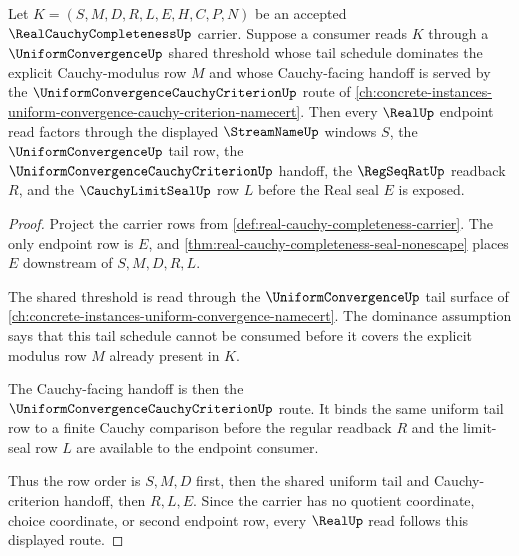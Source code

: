 \begin{theorem}
\label{thm:real-cauchy-completeness-uniform-tail-seal}
Let $K=(S,M,D,R,L,E,H,C,P,N)$ be an accepted $\RealCauchyCompletenessUp$ carrier. Suppose a consumer reads $K$ through a $\UniformConvergenceUp$ shared threshold whose tail schedule dominates the explicit Cauchy-modulus row $M$ and whose Cauchy-facing handoff is served by the $\UniformConvergenceCauchyCriterionUp$ route of \autoref{ch:concrete-instances-uniform-convergence-cauchy-criterion-namecert}. Then every $\RealUp$ endpoint read factors through the displayed $\StreamNameUp$ windows $S$, the $\UniformConvergenceUp$ tail row, the $\UniformConvergenceCauchyCriterionUp$ handoff, the $\RegSeqRatUp$ readback $R$, and the $\CauchyLimitSealUp$ row $L$ before the Real seal $E$ is exposed.
\end{theorem}
\begin{proof}
Project the carrier rows from \autoref{def:real-cauchy-completeness-carrier}. The only endpoint row is $E$, and \autoref{thm:real-cauchy-completeness-seal-nonescape} places $E$ downstream of $S,M,D,R,L$.

The shared threshold is read through the $\UniformConvergenceUp$ tail surface of \autoref{ch:concrete-instances-uniform-convergence-namecert}. The dominance assumption says that this tail schedule cannot be consumed before it covers the explicit modulus row $M$ already present in $K$.

The Cauchy-facing handoff is then the $\UniformConvergenceCauchyCriterionUp$ route. It binds the same uniform tail row to a finite Cauchy comparison before the regular readback $R$ and the limit-seal row $L$ are available to the endpoint consumer.

Thus the row order is $S,M,D$ first, then the shared uniform tail and Cauchy-criterion handoff, then $R,L,E$. Since the carrier has no quotient coordinate, choice coordinate, or second endpoint row, every $\RealUp$ read follows this displayed route.
\end{proof}

